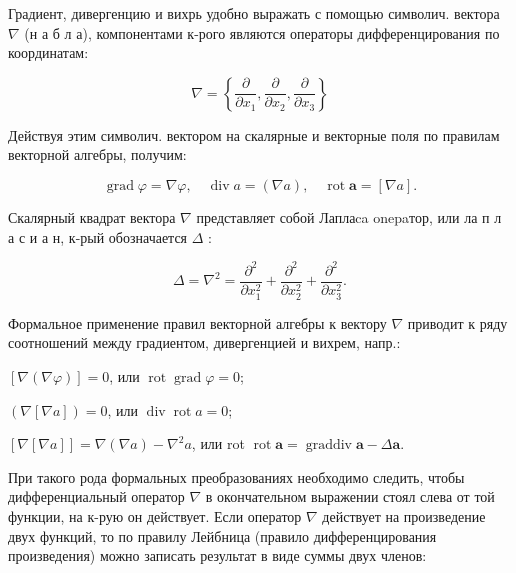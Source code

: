 \documentclass[10pt]{article}
\begin{document}
Градиент, дивергенцию и вихрь удобно выражать с помощью символич. вектора $\nabla$ (н а б л а), компонентами к-рого являются операторы дифференцирования по координатам:



\[

\nabla=\left\{\frac{\partial}{\partial x_{1}}, \frac{\partial}{\partial x_{2}}, \frac{\partial}{\partial x_{3}}\right\}

\]



Действуя этим символич. вектором на скалярные и векторные поля по правилам векторной алгебры, получим:



\[

\operatorname{grad} \varphi=\nabla \varphi, \quad \operatorname{div} a=(\nabla a), \quad \operatorname{rot} \boldsymbol{a}=[\nabla a] .

\]



Скалярный квадрат вектора $\nabla$ представляет собой Лаплаca onepaтор, или ла п л а с и а н, к-рый обозначается $\Delta$ :



\[

\Delta=\nabla^{2}=\frac{\partial^{2}}{\partial x_{1}^{2}}+\frac{\partial^{2}}{\partial x_{2}^{2}}+\frac{\partial^{2}}{\partial x_{3}^{2}} .

\]



Формальное применение правил векторной алгебры к вектору $\nabla$ приводит к ряду соотношений между градиентом, дивергенцией и вихрем, напр.:



$[\nabla(\nabla \varphi)]=0$, или $\operatorname{rot} \operatorname{grad} \varphi=0$;



$(\nabla[\nabla a])=0$, или $\operatorname{div} \operatorname{rot} a=0$;



$[\nabla[\nabla a]]=\nabla(\nabla a)-\nabla^{2} a$, или rot $\operatorname{rot} \boldsymbol{a}=\operatorname{graddiv} \boldsymbol{a}-\Delta \boldsymbol{a}$.



При такого рода формальных преобразованиях необходимо следить, чтобы дифференциальный оператор $\nabla$ в окончательном выражении стоял слева от той функции, на к-рую он действует. Если оператор $\nabla$ действует на произведение двух функций, то по правилу Лейбница (правило дифференцирования произведения) можно записать результат в виде суммы двух членов:
\end{document}
